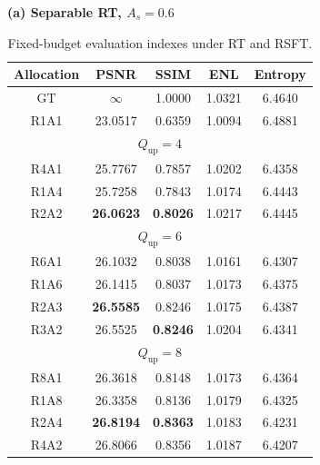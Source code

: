 \documentclass[conference]{IEEEtran}
\begin{document}
\begin{table}[t]
\caption{Fixed-budget evaluation indexes under RT and RSFT.}
\label{tab:evaluation_indexes}
\centering
\scriptsize
\renewcommand{\arraystretch}{0.88}
\setlength{\tabcolsep}{5.2pt}
\textbf{(a) Separable RT, $A_s=0.6$}\\[2pt]
\begin{tabular}{c c c c c}
\hline
Allocation & PSNR & SSIM & ENL & Entropy \\
\hline
GT & $\infty$ & 1.0000 & 1.0321 & 6.4640 \\
R1A1 & 23.0517 & 0.6359 & 1.0094 & 6.4881 \\
\hline
\multicolumn{5}{c}{$Q_{\mathrm{up}}=4$} \\
\hline
R4A1 & 25.7767 & 0.7857 & 1.0202 & 6.4358 \\
R1A4 & 25.7258 & 0.7843 & 1.0174 & 6.4443 \\
R2A2 & \textbf{26.0623} & \textbf{0.8026} & 1.0217 & 6.4445 \\
\hline
\multicolumn{5}{c}{$Q_{\mathrm{up}}=6$} \\
\hline
R6A1 & 26.1032 & 0.8038 & 1.0161 & 6.4307 \\
R1A6 & 26.1415 & 0.8037 & 1.0173 & 6.4375 \\
R2A3 & \textbf{26.5585} & 0.8246 & 1.0175 & 6.4387 \\
R3A2 & 26.5525 & \textbf{0.8246} & 1.0204 & 6.4341 \\
\hline
\multicolumn{5}{c}{$Q_{\mathrm{up}}=8$} \\
\hline
R8A1 & 26.3618 & 0.8148 & 1.0173 & 6.4364 \\
R1A8 & 26.3358 & 0.8136 & 1.0179 & 6.4325 \\
R2A4 & \textbf{26.8194} & \textbf{0.8363} & 1.0183 & 6.4231 \\
R4A2 & 26.8066 & 0.8356 & 1.0187 & 6.4207 \\
\hline
\end{tabular}
\vspace{5pt}


\end{table}
\end{document}
